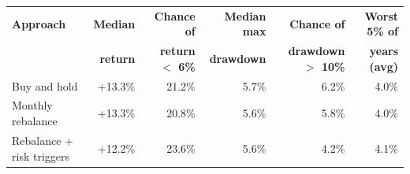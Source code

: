 \begin{tabular}{@{}lrrrrr@{}}
\toprule
\textbf{Approach} & \textbf{Median} & \textbf{Chance of} & \textbf{Median max} & \textbf{Chance of} & \textbf{Worst 5\% of} \\
 & \textbf{return} & \textbf{return $<$ 6\%} & \textbf{drawdown} & \textbf{drawdown $>$ 10\%} & \textbf{years (avg)} \\
\midrule
Buy and hold & +13.3\% & 21.2\% & \textminus{}5.7\% & 6.2\% & \textminus{}4.0\% \\
Monthly rebalance & +13.3\% & 20.8\% & \textminus{}5.6\% & 5.8\% & \textminus{}4.0\% \\
Rebalance + risk triggers & +12.2\% & 23.6\% & \textminus{}5.6\% & 4.2\% & \textminus{}4.1\% \\
\bottomrule
\end{tabular}